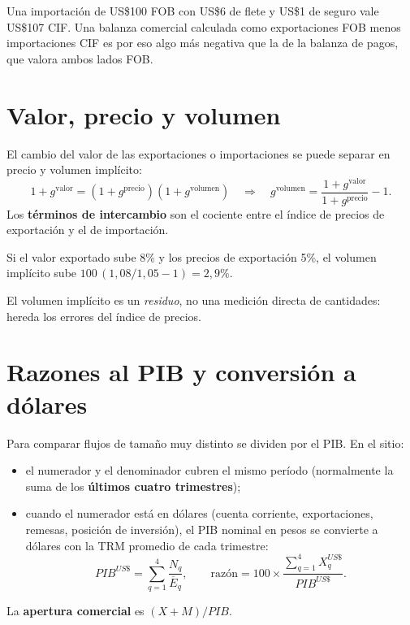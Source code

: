 \begin{dato}
Una importación de US\$100 FOB con US\$6 de flete y US\$1 de seguro vale US\$107 CIF. Una balanza comercial
calculada como exportaciones FOB menos importaciones CIF es por eso algo más negativa que la de la balanza de pagos,
que valora ambos lados FOB.
\end{dato}

\section{Valor, precio y volumen}
El cambio del valor de las exportaciones o importaciones se puede separar en precio y volumen implícito:
\[
1+g^{\text{valor}}=(1+g^{\text{precio}})(1+g^{\text{volumen}})\quad\Longrightarrow\quad
g^{\text{volumen}}=\frac{1+g^{\text{valor}}}{1+g^{\text{precio}}}-1 .
\]
Los \textbf{términos de intercambio} son el cociente entre el índice de precios de exportación y el de importación.

\begin{dato}
Si el valor exportado sube 8\% y los precios de exportación 5\%, el volumen implícito sube $100\,(1{,}08/1{,}05-1)=2{,}9\%$.
\end{dato}

\begin{alerta}
El volumen implícito es un \emph{residuo}, no una medición directa de cantidades: hereda los errores del índice de
precios.
\end{alerta}

\section{Razones al PIB y conversión a dólares}
\label{es:f:razones}
Para comparar flujos de tamaño muy distinto se dividen por el PIB. En el sitio:
\begin{itemize}
\item el numerador y el denominador cubren el mismo período (normalmente la suma de los \textbf{últimos cuatro
  trimestres});
\item cuando el numerador está en dólares (cuenta corriente, exportaciones, remesas, posición de inversión), el PIB
  nominal en pesos se convierte a dólares con la TRM promedio de cada trimestre:
  \[
  PIB^{US\$}=\sum_{q=1}^{4}\frac{N_q}{\overline{E}_q},\qquad
  \text{razón}=100\times\frac{\sum_{q=1}^{4}X^{US\$}_q}{PIB^{US\$}} .
  \]
\end{itemize}
La \textbf{apertura comercial} es $(X+M)/PIB$.

